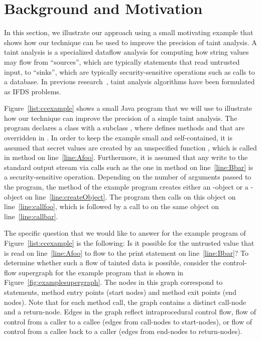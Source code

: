 \section{Background and Motivation}
  \label{sec:MotivatingExample}
  
In this section, we illustrate our approach using a small motivating example that
shows how our technique can be used to improve the precision of taint analysis.
A taint analysis is a specialized dataflow analysis for computing how string values
may flow from ``sources'', which are typically statements that read untrusted input, 
to ``sinks'', which are typically security-sensitive
operations such as calls to 
a database. In previous research~\cite{DBLP:conf/issta/GuarnieriPTDTB11,DBLP:conf/pldi/ArztRFBBKTOM14}, 
taint analysis algorithms have been formulated as IFDS problems.     
  

  
Figure~\ref{list:ccexample} shows a small Java program that we will use to illustrate
how our technique can improve the precision of a simple taint analysis. The program
declares a class  with a subclass ,  where  defines methods 
 and  that are overridden in .  In order to keep the 
example small and self-contained, it is assumed  that secret values are created by 
an unspecified function , which is called in method  on 
line~\ref{line:Afoo}. Furthermore, it is assumed that any write to the standard output 
stream via calls  such as the one in method  
on line~\ref{line:Bbar} is a security-sensitive operation. Depending on the number of 
arguments passed to the program, the  method of the example program creates 
either an -object or a -object on line~\ref{line:createObject}. The 
program then calls  on this object on line~\ref{line:callfoo}, which is 
followed by a call to  on the same object on line~\ref{line:callbar}.  
 
The specific question that we would like to answer for the example program of
Figure~\ref{list:ccexample} is the following: Is it possible for the untrusted value 
that is read on line~\ref{line:Afoo} to flow to the print statement on line~\ref{line:Bbar}? 
%
To determine whether such a flow of tainted data is possible, consider the control-flow
supergraph for the example program that is shown in Figure~\ref{fig:examplesupergraph}.
 The nodes in this graph correspond to statements, method entry points (start nodes) and 
method exit points (end nodes). Note that for each method call, the graph contains a 
distinct call-node and a return-node. Edges in the graph reflect intraprocedural control flow, 
flow of control from a caller to a callee (edges from call-nodes to start-nodes), or
flow of control from a callee back to a caller (edges from end-nodes to return-nodes). 

